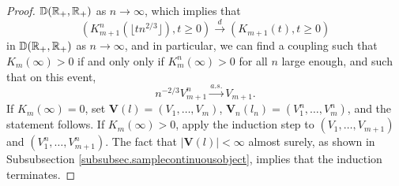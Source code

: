 \begin{proof}
${\mathbb D}({\mathbb R}_+,{\mathbb R}_+)$ as $n\to\infty$, which implies that 
$$(K^n_{m+1}(\lfloor t n^{2/3} \rfloor ),t\geq 0)\overset{d}{\to} (K_{m+1}(t),t\geq 0)$$ in ${\mathbb D}({\mathbb R}_+,{\mathbb R}_+)$ as $n\to\infty$, and in particular, we can find a coupling such that $K_m(\infty)>0$ if and only only if $K^n_m(\infty)>0$ for all $n$ large enough, and such that on this event,
$$n^{-2/3}V_{m+1}^n\overset{a.s.}{\to}V_{m+1}.$$
If $K_m(\infty)=0$, set $\mathbf{V}(l)=(V_1,\dots,V_m)$, $\mathbf{V}_n(l_n)=(V^n_1,\dots,V^n_m)$, and the statement follows. If $K_m(\infty)>0$, apply the induction step to $(V_1,\dots,V_{m+1})$ and $(V^n_1,\dots,V^n_{m+1})$. The fact that $|\mathbf{V}(l)|<\infty$ almost surely, as shown in Subsubsection \ref{subsubsec.samplecontinuousobject}, implies that the induction terminates.
\end{proof}

